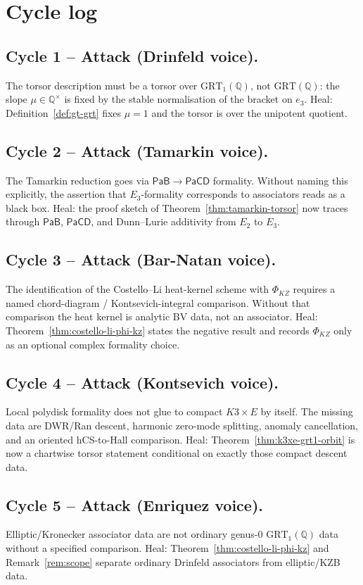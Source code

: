 \documentclass[11pt]{amsart}
\theoremstyle{plain}
\theoremstyle{definition}
\theoremstyle{remark}
\providecommand{\Q}{\mathbb{Q}}
\providecommand{\GRT}{\mathrm{GRT}}
\providecommand{\PaB}{\mathsf{PaB}}
\providecommand{\PaCD}{\mathsf{PaCD}}
\begin{document}
\section{Cycle log}
\label{sec:cycle-log}

\subsection*{Cycle 1 -- Attack (Drinfeld voice).} The torsor description must be a torsor over $\GRT_1(\Q)$, not $\GRT(\Q)$: the slope $\mu \in \Q^\times$ is fixed by the stable normalisation of the bracket on $e_3$. Heal: Definition~\ref{def:gt-grt} fixes $\mu = 1$ and the torsor is over the unipotent quotient.

\subsection*{Cycle 2 -- Attack (Tamarkin voice).} The Tamarkin reduction goes via $\PaB \to \PaCD$ formality. Without naming this explicitly, the assertion that $E_3$-formality corresponds to associators reads as a black box. Heal: the proof sketch of Theorem~\ref{thm:tamarkin-torsor} now traces through $\PaB$, $\PaCD$, and Dunn--Lurie additivity from $E_2$ to $E_3$.

\subsection*{Cycle 3 -- Attack (Bar-Natan voice).} The identification of the Costello--Li heat-kernel scheme with $\Phi_{KZ}$ requires a named chord-diagram / Kontsevich-integral comparison. Without that comparison the heat kernel is analytic BV data, not an associator. Heal: Theorem~\ref{thm:costello-li-phi-kz} states the negative result and records $\Phi_{KZ}$ only as an optional complex formality choice.

\subsection*{Cycle 4 -- Attack (Kontsevich voice).} Local polydisk formality does not glue to compact $K3\times E$ by itself. The missing data are DWR/Ran descent, harmonic zero-mode splitting, anomaly cancellation, and an oriented hCS-to-Hall comparison. Heal: Theorem~\ref{thm:k3xe-grt1-orbit} is now a chartwise torsor statement conditional on exactly those compact descent data.

\subsection*{Cycle 5 -- Attack (Enriquez voice).} Elliptic/Kronecker associator data are not ordinary genus-$0$ $\GRT_1(\Q)$ data without a specified comparison. Heal: Theorem~\ref{thm:costello-li-phi-kz} and Remark~\ref{rem:scope} separate ordinary Drinfeld associators from elliptic/KZB data.
\end{document}

